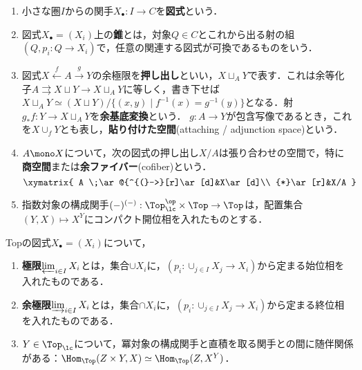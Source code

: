 \documentclass[uplatex, dvipdfmx]{jsreport}
\begin{document}
\begin{notation}[標準的構成]\mbox{}
    \begin{enumerate}
        \item 小さな圏$I$からの関手$X_\bullet:I\to C$を\textbf{図式}という．
        \item 図式$X_\bullet=(X_i)$上の\textbf{錐}とは，対象$Q\in C$とこれから出る射の組$(Q,p_i:Q\to X_i)$で，任意の関連する図式が可換であるものをいう．
        \item 図式$X\xleftarrow{f}A\xrightarrow{g}Y$の余極限を\textbf{押し出し}といい，$X\sqcup_AY$で表す．これは余等化子$A\rightrightarrows X\sqcup Y\to X\sqcup_AY$に等しく，書き下せば$X\sqcup_AY\simeq(X\sqcup Y)/\{(x,y)\mid f^{-1}(x)=g^{-1}(y)\}$となる．射$g_*f:Y\to X\sqcup_AY$を\textbf{余基底変換}という．
        $g:A\to Y$が包含写像であるとき，これを$X\cup_fY$とも表し，\textbf{貼り付けた空間}(attaching / adjunction space)という．
        \item $A\mono X$について，次の図式の押し出し$X/A$は張り合わせの空間で，特に\textbf{商空間}または\textbf{余ファイバー}(cofiber)という．
        \[\xymatrix{
            A \;\ar@{^{(}->}[r]\ar[d]&X\ar[d]\\
            {*}\ar[r]&X/A
        }\]
        \item 指数対象の構成関手$(-)^{(-)}:\Top^\op_\lc\times\Top\to\Top$は，配置集合$(Y,X)\mapsto X^Y$にコンパクト開位相を入れたものとする．
    \end{enumerate}
\end{notation}

\begin{proposition}
    Topの図式$X_\bullet=(X_i)$について，
    \begin{enumerate}
        \item \textbf{極限}$\varprojlim_{i\in I}X_i$とは，集合$\cup X_i$に，$(p_i:\cup_{j\in I}X_j\to X_i)$から定まる始位相を入れたものである．
        \item \textbf{余極限}$\varinjlim_{i\in I}X_i$とは，集合$\cap X_i$に，$(p_i:\cup_{j\in I}X_j\to X_i)$から定まる終位相を入れたものである．
        \item $Y\in\Top_\lc$について，冪対象の構成関手と直積を取る関手との間に随伴関係がある：$\Hom_\Top(Z\times Y,X)\simeq\Hom_\Top(Z,X^Y)$．
    \end{enumerate}
\end{proposition}
\end{document}
